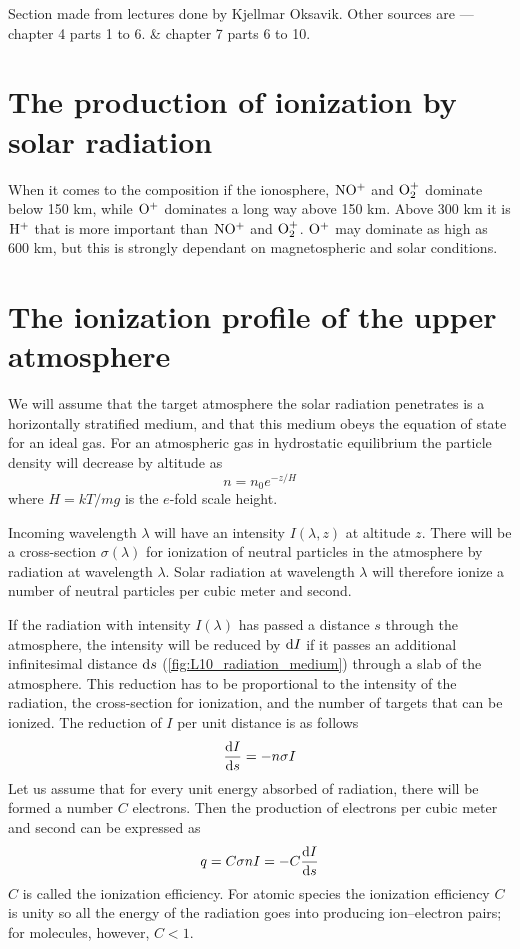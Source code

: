 \begin{remark}
    Section made from lectures done by Kjellmar Oksavik. Other sources are \citet{BrekkeAsgeir2013Potu} --- chapter 4 parts 1 to 6. \& chapter 7 parts 6 to 10.
\end{remark}
\section[Production of ionization]{The production of ionization by solar radiation}
When it comes to the composition if the ionosphere, \(\pres{}{}{NO}^+\) and \(\pres{}{}{O}_2^+\) dominate below 150 km, while \(\pres{}{}{O}^+\) dominates a long way above 150 km. Above 300 km it is \(\pres{}{}{H}^+\) that is more important than \(\pres{}{}{NO}^+\) and \(\pres{}{}{O}_2^+\). \(\pres{}{}{O}^+\) may dominate as high as 600 km, but this is strongly dependant on magnetospheric and solar conditions.

\section[The ionization profile]{The ionization profile of the upper atmosphere}
We will assume that the target atmosphere the solar radiation penetrates is a horizontally stratified medium, and that this medium obeys the equation of state for an ideal gas. For an atmospheric gas in hydrostatic equilibrium the particle density will decrease by altitude as
\begin{equation*}
    n=n_0e^{-z/H}
\end{equation*}
where \(H=kT/mg\) is the \(e\)-fold scale height.

Incoming wavelength \(\lambda \) will have an intensity \(I\left(\lambda,z\right)\) at altitude  \(z\). There will be a cross-section \(\sigma\left(\lambda\right)\) for ionization of neutral particles in the atmosphere by radiation at wavelength \(\lambda \). Solar radiation at wavelength \(\lambda \) will therefore ionize a number of neutral particles per cubic meter and second.

If the radiation with intensity \(I(\lambda)\) has passed a distance \(s\) through the atmosphere, the intensity will be reduced by \(\tn{d}I\) if it passes an additional infinitesimal distance \(\tn{d}s\) (\cref{fig:L10_radiation_medium}) through a slab of the atmosphere. This reduction has to be proportional to the intensity of the radiation, the cross-section for ionization, and the number of targets that can be ionized. The reduction of \(I\) per unit distance is as follows
\begin{equation}\label{eq:L10_reduction_of_I}
    \fracd[s]{I}=-n\sigma I
\end{equation}
Let us assume that for every unit energy absorbed of radiation, there will be formed a number \(C\) electrons. Then the production of electrons per cubic meter and second can be expressed as
\begin{equation*}
    q=C\sigma nI=-C\fracd[s]{I}
\end{equation*}
\(C\) is called the ionization efficiency. For atomic species the ionization efficiency \(C\) is unity so all the energy of the radiation goes into producing ion–electron pairs; for molecules, however, \(C<1\).

